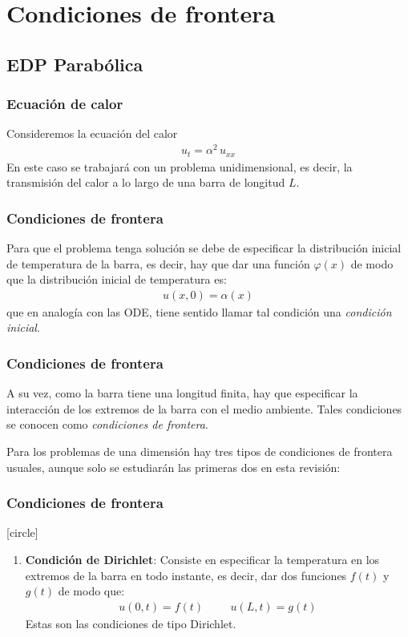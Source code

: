 \section{Condiciones de frontera}
\subsection{EDP Parabólica}
\begin{frame}
\frametitle{Ecuación de calor}
Consideremos la ecuación del calor
\begin{align*}
u_{t} =  \alpha^{2} \,  u_{xx}
\end{align*}
En este caso se trabajará con un problema unidimensional, es decir, la transmisión del calor a lo largo de una barra de longitud $L$.
\end{frame}
\begin{frame}
\frametitle{Condiciones de frontera}
Para que el problema tenga solución se debe de especificar la distribución inicial de temperatura de la barra, es decir, hay que dar una función $\varphi (x)$ de modo que la distribución inicial de temperatura es:
\begin{align}
u(x, 0) = \alpha (x)
\label{eq:ecuacion_06_02_02}
\end{align}
que en analogía con las ODE, tiene sentido llamar tal condición una \emph{condición inicial}.
\end{frame}
\begin{frame}
\frametitle{Condiciones de frontera}
A su vez, como la barra tiene una longitud finita, hay que especificar la interacción de los extremos de la barra con el medio ambiente. Tales condiciones se conocen como \emph{condiciones de frontera}.
\par
Para los problemas de una dimensión hay tres tipos de condiciones de frontera usuales, aunque solo se estudiarán las primeras dos en esta revisión:
\end{frame}
\begin{frame}
\frametitle{Condiciones de frontera}
[circle]
\begin{enumerate}
\item \textbf{Condición de Dirichlet}: Consiste en especificar la temperatura en los extremos de la barra en todo instante, es decir, dar dos funciones $f(t)$ y $g(t)$ de modo que:
\begin{align}
u(0, t) = f (t)  \hspace{1cm} u(L, t) = g(t)
\label{eq:ecuacion_06_02_03}    
\end{align}
Estas son las condiciones de tipo Dirichlet.
\seti
\end{enumerate}
\end{frame}

